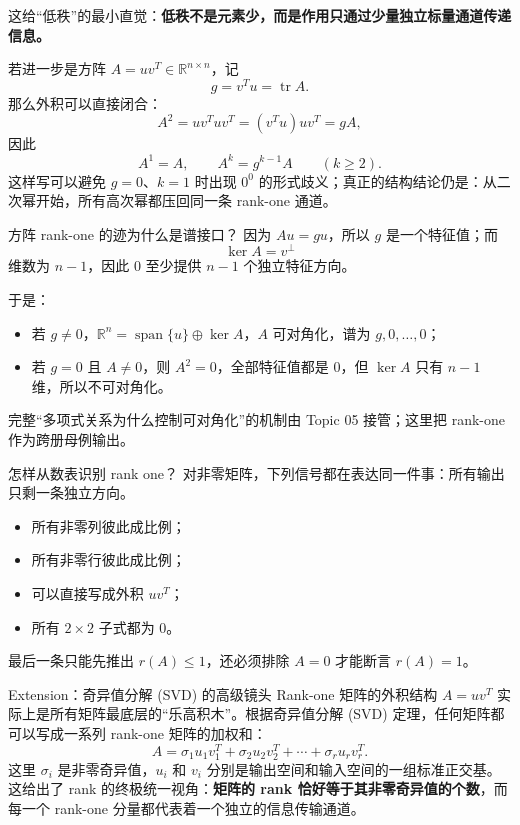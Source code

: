 \documentclass[11pt,a4paper]{ctexart}
\newcommand{\kw}[1]{\textbf{\color{deep}#1}}
\begin{document}
这给“低秩”的最小直觉：\kw{低秩不是元素少，而是作用只通过少量独立标量通道传递信息。}

若进一步是方阵 $A=uv^T\in\mathbb R^{n\times n}$，记
\[
g=v^Tu=\operatorname{tr}A.
\]
那么外积可以直接闭合：
\[
A^2=uv^Tuv^T=(v^Tu)uv^T=gA,
\]
因此
\[
A^1=A,
\qquad
\boxed{A^k=g^{k-1}A\qquad(k\ge2).}
\]
这样写可以避免 $g=0$、$k=1$ 时出现 $0^0$ 的形式歧义；真正的结构结论仍是：从二次幂开始，所有高次幂都压回同一条 rank-one 通道。

\begin{corebox}{方阵 rank-one 的迹为什么是谱接口？}
因为 $Au=gu$，所以 $g$ 是一个特征值；而
\[
\ker A=v^\perp
\]
维数为 $n-1$，因此 $0$ 至少提供 $n-1$ 个独立特征方向。

于是：
\begin{itemize}
  \item 若 $g\neq0$，$\mathbb R^n=\operatorname{span}\{u\}\oplus\ker A$，$A$ 可对角化，谱为 $g,0,\dots,0$；
  \item 若 $g=0$ 且 $A\neq0$，则 $A^2=0$，全部特征值都是 $0$，但 $\ker A$ 只有 $n-1$ 维，所以不可对角化。
\end{itemize}
完整“多项式关系为什么控制可对角化”的机制由 Topic 05 接管；这里把 rank-one 作为跨册母例输出。
\end{corebox}

\begin{methodbox}{怎样从数表识别 rank one？}
对非零矩阵，下列信号都在表达同一件事：所有输出只剩一条独立方向。
\begin{itemize}
  \item 所有非零列彼此成比例；
  \item 所有非零行彼此成比例；
  \item 可以直接写成外积 $uv^T$；
  \item 所有 $2\times2$ 子式都为 $0$。
\end{itemize}
最后一条只能先推出 $r(A)\le1$，还必须排除 $A=0$ 才能断言 $r(A)=1$。
\end{methodbox}

\begin{examplebox}{Extension：奇异值分解 (SVD) 的高级镜头}
Rank-one 矩阵的外积结构 $A = uv^T$ 实际上是所有矩阵最底层的“乐高积木”。根据奇异值分解 (SVD) 定理，任何矩阵都可以写成一系列 rank-one 矩阵的加权和：
\[
A = \sigma_1 u_1 v_1^T + \sigma_2 u_2 v_2^T + \cdots + \sigma_r u_r v_r^T.
\]
这里 $\sigma_i$ 是非零奇异值，$u_i$ 和 $v_i$ 分别是输出空间和输入空间的一组标准正交基。
这给出了 rank 的终极统一视角：\kw{矩阵的 rank 恰好等于其非零奇异值的个数}，而每一个 rank-one 分量都代表着一个独立的信息传输通道。
\end{examplebox}
\end{document}
